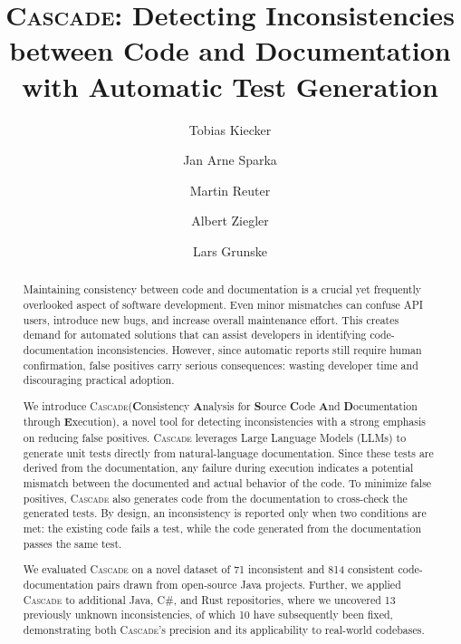 \documentclass[acmsmall, screen]{acmart}
\newcommand{\tool}{\textsc{Cascade}\xspace}
\begin{document}
\title{\tool: Detecting Inconsistencies between Code and Documentation with Automatic Test Generation}

\author{Tobias Kiecker}

\author{Jan Arne Sparka}

\author{Martin Reuter}

\author{Albert Ziegler}

\author{Lars Grunske}

\begin{abstract}
Maintaining consistency between code and documentation is a crucial yet frequently overlooked aspect of software development. Even minor mismatches can confuse API users, introduce new bugs, and increase overall maintenance effort. %
This creates demand for automated solutions that can assist developers in identifying code-documentation inconsistencies. However, since automatic reports still require human confirmation, false positives carry serious consequences: wasting developer time and discouraging practical adoption.

We introduce \tool (\textbf{C}onsistency \textbf{A}nalysis for \textbf{S}ource \textbf{C}ode \textbf{A}nd \textbf{D}ocumentation through \textbf{E}xecution), a novel tool for detecting inconsistencies with a strong emphasis on reducing false positives. 
\tool leverages Large Language Models (LLMs) to generate unit tests directly from natural-language documentation. 
Since these tests are derived from the documentation, any failure during execution indicates a potential mismatch between the documented and actual behavior of the code.
To minimize false positives, \tool also generates code from the documentation to cross-check the generated tests. By design, an inconsistency is reported only when two conditions are met: the existing code fails a test, while the code generated from the documentation passes the same test.

We evaluated \tool on a novel dataset of 71 inconsistent and 814 consistent code-documentation pairs drawn from open-source Java projects. Further, we applied \tool to additional Java, C\#, and Rust repositories, where we uncovered 13 previously unknown inconsistencies, of which 10 have subsequently been fixed, demonstrating both \tool's precision and its applicability to real-world codebases.
\end{abstract}
\end{document}
